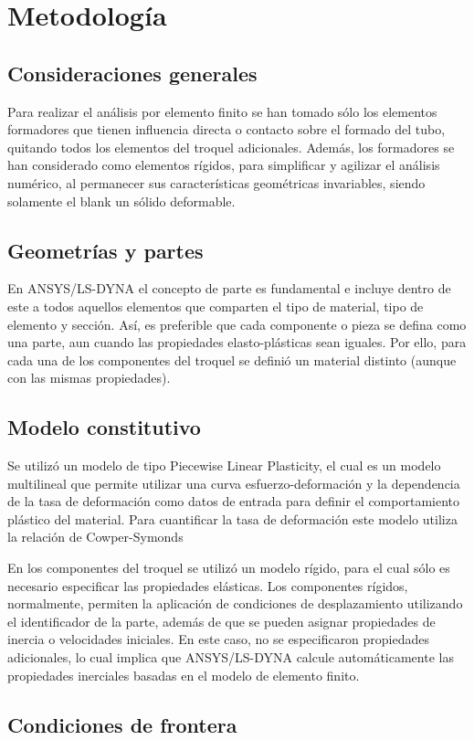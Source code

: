 \chapter{Metodología}

\section{Consideraciones generales}

Para realizar el análisis por elemento finito se han tomado sólo los elementos formadores que tienen influencia directa o contacto sobre el formado del tubo, quitando todos los elementos del troquel adicionales. Además, los formadores se han considerado como elementos rígidos, para simplificar y agilizar el análisis numérico, al permanecer sus características geométricas invariables, siendo solamente el blank un sólido deformable.

\section{Geometrías y partes}

En ANSYS/LS-DYNA el concepto de parte es fundamental e incluye dentro de este a todos aquellos elementos que comparten el tipo de material, tipo de elemento y sección. Así, es preferible que cada componente o pieza se defina como una parte, aun cuando las propiedades elasto-plásticas sean iguales. Por ello, para cada una de los componentes del troquel se definió un material distinto (aunque con las mismas propiedades).

\section{Modelo constitutivo}

Se utilizó un modelo de tipo Piecewise Linear Plasticity, el cual es un modelo multilineal que permite utilizar una curva esfuerzo-deformación y la dependencia de la tasa de deformación como datos de entrada para definir el comportamiento plástico del material. Para cuantificar la tasa de deformación este modelo utiliza la relación de Cowper-Symonds

En los componentes del troquel se utilizó un modelo rígido, para el cual sólo es necesario especificar las propiedades elásticas. Los componentes rígidos, normalmente, permiten la aplicación de condiciones de desplazamiento utilizando el identificador de la parte, además de que se pueden asignar propiedades de inercia o velocidades iniciales. En este caso, no se especificaron propiedades adicionales, lo cual implica que ANSYS/LS-DYNA calcule automáticamente las propiedades inerciales basadas en el modelo de elemento finito.


\section{Condiciones de frontera}




